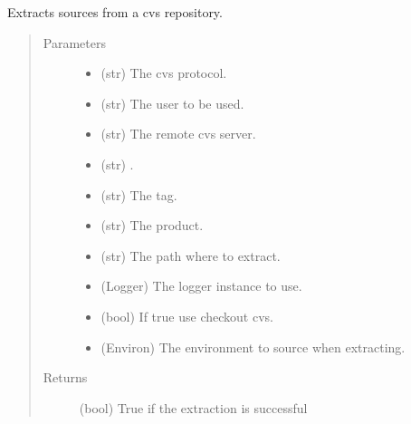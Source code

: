 \documentclass[a4paper,10pt,english]{sphinxmanual}
\begin{document}

\begin{fulllineitems}
\label{\detokenize{apidoc_src/src:src.system.cvs_extract}}
Extracts sources from a cvs repository.
\begin{quote}\begin{description}
\item[{Parameters}] \leavevmode\begin{itemize}
\item {} 
 \textendash{} (str) The cvs protocol.

\item {} 
 \textendash{} (str) The user to be used.

\item {} 
 \textendash{} (str) The remote cvs server.

\item {} 
 \textendash{} (str) .

\item {} 
 \textendash{} (str) The tag.

\item {} 
 \textendash{} (str) The product.

\item {} 
 \textendash{} (str) The path where to extract.

\item {} 
 \textendash{} (Logger) The logger instance to use.

\item {} 
 \textendash{} (bool) If true use checkout cvs.

\item {} 
 \textendash{} (Environ) 
The environment to source when extracting.

\end{itemize}

\item[{Returns}] \leavevmode
(bool) True if the extraction is successful

\end{description}\end{quote}

\end{fulllineitems}
\end{document}
